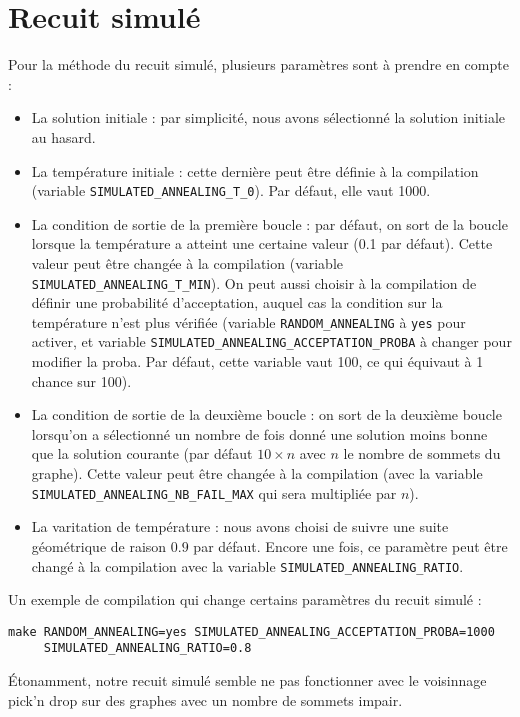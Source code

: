\documentclass[12pt, a4paper]{article}
\begin{document}
\section{Recuit simulé}
Pour la méthode du recuit simulé, plusieurs paramètres sont à prendre en compte :
\begin{itemize}
\item La solution initiale : par simplicité, nous avons sélectionné la solution initiale au hasard.
\item La température initiale : cette dernière peut être définie à la compilation (variable \texttt{SIMULATED\_ANNEALING\_T\_0}). Par défaut, elle vaut 1000.
\item La condition de sortie de la première boucle : par défaut, on sort de la boucle lorsque la température a atteint une certaine valeur (0.1 par défaut). Cette valeur peut être changée à la compilation (variable \texttt{SIMULATED\_ANNEALING\_T\_MIN}). On peut aussi choisir à la compilation de définir une probabilité d'acceptation, auquel cas la condition sur la température n'est plus vérifiée (variable \texttt{RANDOM\_ANNEALING} à \texttt{yes} pour activer, et variable \texttt{SIMULATED\_ANNEALING\_ACCEPTATION\_PROBA} à changer pour modifier la proba. Par défaut, cette variable vaut 100, ce qui équivaut à 1 chance sur 100).
\item La condition de sortie de la deuxième boucle : on sort de la deuxième boucle lorsqu'on a sélectionné un nombre de fois donné une solution moins bonne que la solution courante (par défaut $10 \times n$ avec $n$ le nombre de sommets du graphe). Cette valeur peut être changée à la compilation (avec la variable \texttt{SIMULATED\_ANNEALING\_NB\_FAIL\_MAX} qui sera multipliée par $n$).
\item La varitation de température : nous avons choisi de suivre une suite géométrique de raison $0.9$ par défaut. Encore une fois, ce paramètre peut être changé à la compilation avec la variable \texttt{SIMULATED\_ANNEALING\_RATIO}.
\end{itemize}

Un exemple de compilation qui change certains paramètres du recuit simulé :
\begin{verbatim}
make RANDOM_ANNEALING=yes SIMULATED_ANNEALING_ACCEPTATION_PROBA=1000
     SIMULATED_ANNEALING_RATIO=0.8
\end{verbatim}

\'Etonamment, notre recuit simulé semble ne pas fonctionner avec le voisinnage pick'n drop sur des graphes avec un nombre de sommets impair.
\end{document}
